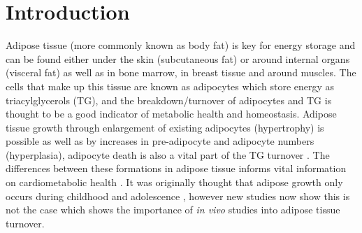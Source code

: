 \documentclass[class=article, crop=false]{standalone}
\begin{document}
 
\label{Chap:Lipid}

\section{Introduction}

Adipose tissue (more commonly known as body fat) is key for energy storage and can be found either under the skin (subcutaneous fat) or around internal organs (visceral fat) as well as in bone marrow, in breast tissue and around muscles. The cells that make up this tissue are known as adipocytes which store energy as triacylglycerols (TG), and the breakdown/turnover of adipocytes and TG is thought to be a good indicator of metabolic health and homeostasis. Adipose tissue growth through enlargement of existing adipocytes (hypertrophy) is possible as well as by increases in pre-adipocyte and adipocyte numbers (hyperplasia), adipocyte death is also a vital part of the TG turnover \cite{White2019DynamicsDisease}. The differences between these formations in adipose tissue informs vital information on cardiometabolic health \cite{Carnethon2002Serum19871998}. It was originally thought that adipose growth only occurs during childhood and adolescence \cite{Salans1973StudiesPatients}, however new studies now show this is not the case \cite{White2016DifferencesWomen} which shows the importance of \textit{in vivo} studies into adipose tissue turnover.
\end{document}

